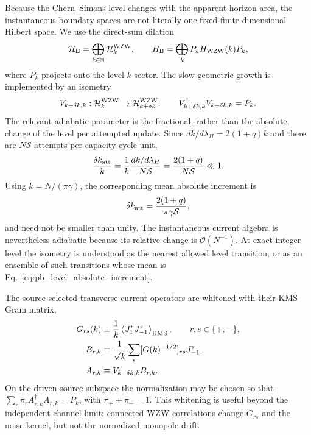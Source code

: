 \documentclass[aps,prd,twocolumn,10pt,superscriptaddress,nofootinbib]{revtex4-2}
\begin{document}
Because the Chern--Simons level changes with the apparent-horizon area, the
instantaneous boundary spaces are not literally one fixed finite-dimensional
Hilbert space.  We use the direct-sum dilation
\begin{equation}
 \mathcal H_{\rm B}=\bigoplus_{k\in\mathbb N}\mathcal H_k^{\rm WZW},
 \qquad
 H_{\rm B}=\bigoplus_k P_k H_{\rm WZW}(k)P_k,
 \label{eq:pb_hamiltonian_bundle}
\end{equation}
where $P_k$ projects onto the level-$k$ sector.  The slow geometric growth is
implemented by an isometry
\begin{equation}
 V_{k+\delta k,k}:\mathcal H_k^{\rm WZW}
\rightarrow
 \mathcal H_{k+\delta k}^{\rm WZW},
 \qquad V_{k+\delta k,k}^{\dagger}V_{k+\delta k,k}=P_k.
 \label{eq:pb_level_isometry}
\end{equation}
The relevant adiabatic parameter is the fractional, rather than the
absolute, change of the level per attempted update.  Since
$dk/d\lambda_H=2(1+q)k$ and there are $N\mathcal S$ attempts per
capacity-cycle unit,
\begin{equation}
 \frac{\delta k_{\rm att}}{k}
 =\frac{1}{k}\frac{dk/d\lambda_H}{N\mathcal S}
 =\frac{2(1+q)}{N\mathcal S}\ll1.
 \label{eq:pb_level_adiabaticity}
\end{equation}
Using $k=N/(\pi\gamma)$, the corresponding mean absolute increment is
\begin{equation}
 \delta k_{\rm att}
 =\frac{2(1+q)}{\pi\gamma\mathcal S},
 \label{eq:pb_level_absolute_increment}
\end{equation}
and need not be smaller than unity.  The instantaneous current algebra is
nevertheless adiabatic because its relative change is
$\mathcal O(N^{-1})$.  At exact integer level the isometry is understood as
the nearest allowed level transition, or as an ensemble of such transitions
whose mean is Eq.~\eqref{eq:pb_level_absolute_increment}.

The source-selected transverse current operators are whitened with their KMS
Gram matrix,
\begin{align}
 G_{rs}(k)&\equiv
 \frac{1}{k}\left\langle J^{r}_{1}J^{s}_{-1}\right\rangle_{\rm KMS},
 \qquad r,s\in\{+,-\},
 \label{eq:pb_current_gram}\\
 B_{r,k}&\equiv
 \frac{1}{\sqrt{k}}\sum_s[G(k)^{-1/2}]_{rs}J^s_{-1},
 \label{eq:pb_whitened_current}\\
 A_{r,k}&\equiv V_{k+\delta k,k}B_{r,k}.
 \label{eq:pb_level_transition}
\end{align}
On the driven source subspace the normalization may be chosen so that
$\sum_r\pi_r A_{r,k}^{\dagger}A_{r,k}=P_k$, with
$\pi_++\pi_-=1$.  This whitening is useful beyond the independent-channel
limit: connected WZW correlations change $G_{rs}$ and the noise kernel, but
not the normalized monopole drift.
\end{document}
